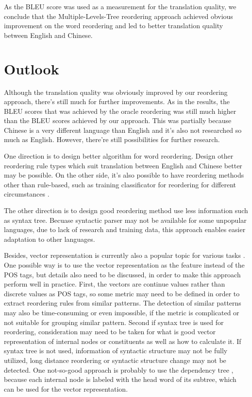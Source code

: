 As the BLEU score was used as a measurement for the translation quality, we conclude that the Multiple-Levels-Tree reordering approach achieved obvious improvement on the word reordering and led to better translation quality between English and Chinese.

\section{Outlook}
\label{ch:Discussion:sec:Outlook}

Although the translation quality was obviously improved by our reordering approach, there's still much for further improvements. As in the results, the BLEU scores that was achieved by the oracle reordering was still much higher than the BLEU scores achieved by our approach. This was partially because Chinese is a very different language than English and it's also not researched so much as English. However, there're still possibilities for further research.

One direction is to design better algorithm for word reordering. Design other reordering rule types which suit translation between English and Chinese better may be possible. On the other side, it's also possible to have reordering methods other than rule-based, such as training classificator for reordering for different circumstances \citep{google}.

The other direction is to design good reordering method use less information such as syntax tree. Becuase syntactic parser may not be available for some unpopular languages, due to lack of research and training data, this approach enables easier adaptation to other languages.

Besides, vector representation is currently also a popular topic for various tasks \citep{oxford, Mikolov}. One possible way is to use the vector representation as the feature instead of the POS tags, but details also need to be discussed, in order to make this approach perform well in practice. First, the vectors are continue values rather than discrete values as POS tags, so some metric may need to be defined in order to extract reordering rules from similar patterns. The detection of similar patterns may also be time-consuming or even impossible, if the metric is complicated or not suitable for grouping similar pattern. Second if syntax tree is used for reordering, consideration may need to be taken for what is good vector representation of internal nodes or constituents as well as how to calculate it. If syntax tree is not used, information of syntactic structure may not be fully utilized, long distance reordering or syntactic structure change may not be detected. One not-so-good approach is probably to use the dependency tree \citep{depend}, because each internal node is labeled with the head word of its subtree, which can be used for the vector representation. 

